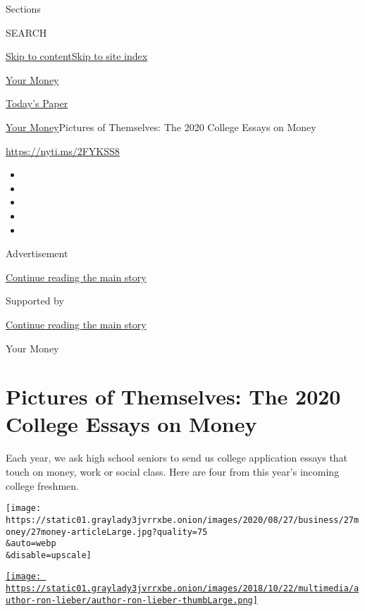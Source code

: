 Sections

SEARCH

\protect\hyperlink{site-content}{Skip to
content}\protect\hyperlink{site-index}{Skip to site index}

\href{https://www.nytimes3xbfgragh.onion/section/your-money}{Your Money}

\href{https://myaccount.nytimes3xbfgragh.onion/auth/login?response_type=cookie\&client_id=vi}{}

\href{https://www.nytimes3xbfgragh.onion/section/todayspaper}{Today's
Paper}

\href{/section/your-money}{Your Money}\textbar{}Pictures of Themselves:
The 2020 College Essays on Money

\url{https://nyti.ms/2FYKSS8}

\begin{itemize}
\item
\item
\item
\item
\item
\end{itemize}

Advertisement

\protect\hyperlink{after-top}{Continue reading the main story}

Supported by

\protect\hyperlink{after-sponsor}{Continue reading the main story}

Your Money

\hypertarget{pictures-of-themselves-the-2020-college-essays-on-money}{%
\section{Pictures of Themselves: The 2020 College Essays on
Money}\label{pictures-of-themselves-the-2020-college-essays-on-money}}

Each year, we ask high school seniors to send us college application
essays that touch on money, work or social class. Here are four from
this year's incoming college freshmen.

\texttt{[image: https://static01.graylady3jvrrxbe.onion/images/2020/08/27/business/27money/27money-articleLarge.jpg?quality=75\\\&auto=webp\\\&disable=upscale]}

\href{https://www.nytimes3xbfgragh.onion/by/ron-lieber}{\texttt{[image: https://static01.graylady3jvrrxbe.onion/images/2018/10/22/multimedia/author-ron-lieber/author-ron-lieber-thumbLarge.png]}}

